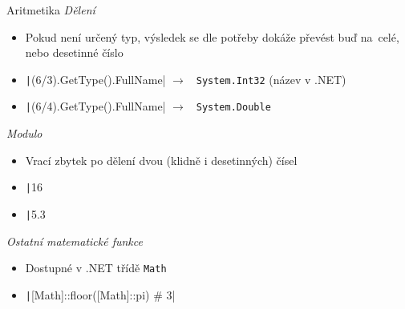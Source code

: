 \documentclass[main.tex]{subfiles}
\begin{document}
\begin{frame}{Aritmetika}
   \textit{Dělení}
   \begin{itemize}
     \item Pokud není určený typ, výsledek se dle potřeby dokáže převést buď na~celé, nebo desetinné číslo
     \item \texttt|(6/3).GetType().FullName| $\to$ {\color{codered}\texttt{ System.Int32}} (název v .NET)
     \item \texttt|(6/4).GetType().FullName| $\to$ {\color{codered}\texttt{ System.Double}}
   \end{itemize}
  \vspace{5mm}
   \textit{Modulo}
   \begin{itemize}
     \item Vrací zbytek po dělení dvou (klidně i desetinných) čísel
     \item \texttt|16 %
     \item \texttt|5.3 %
   \end{itemize}
   \vspace{3mm}
   \textit{Ostatní matematické funkce}
  \begin{itemize}
    \item Dostupné v .NET třídě \texttt{Math}
    \item \texttt|[Math]::floor([Math]::pi) # 3|
  \end{itemize}
   \framebreak


\end{frame}
\end{document}
